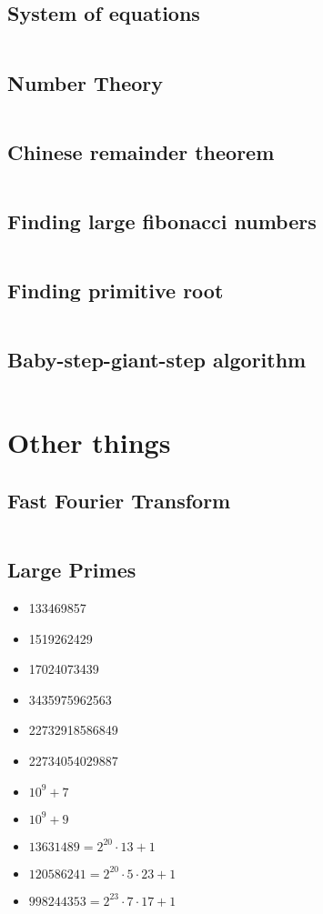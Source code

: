 \documentclass[8pt,a4paper,landscape,oneside]{amsart}
\newcommand{\codec}[1]{\inputminted[fontsize=\large,tabsize=2,baselinestretch=1]{cpp}{code/#1}}
\newcommand{\codep}[1]{\inputminted[fontsize=\large,tabsize=2,baselinestretch=1]{py}{code/#1}}
\begin{document}
\begin{multicols*}{2}
\begin{large}
\subsection{System of equations}
\codep{gaussianelimination.py}
\subsection{Number Theory}
\codep{gcdbezout.py}
\iffalse
\subsection{Primes and Prime factorization}
\codep{primecalc.py}
\fi
\subsection{Chinese remainder theorem}
\codep{crt.py}
\subsection{Finding large fibonacci numbers}
\codep{fibonacci.py}
\subsection{Finding primitive root}
\codep{primitiveroot.py}
\subsection{Baby-step-giant-step algorithm}
\codep{babystepgiantstep.py}
\section{Other things}
\subsection{Fast Fourier Transform}
\codec{fft.cpp}
\subsection{Large Primes}
\begin{itemize}
    \item 133469857
    \item 1519262429
    \item 17024073439
    \item 3435975962563
    \item 22732918586849
    \item 22734054029887
    \item $10^9+7$
    \item $10^9+9$
    \item $13631489 = 2^{20}\cdot 13 + 1$
    \item $120586241 = 2^{20}\cdot 5\cdot 23 + 1$
    \item $998244353 = 2^{23}\cdot 7\cdot 17 + 1$
\end{itemize}

\end{large}
\end{multicols*}
\end{document}
